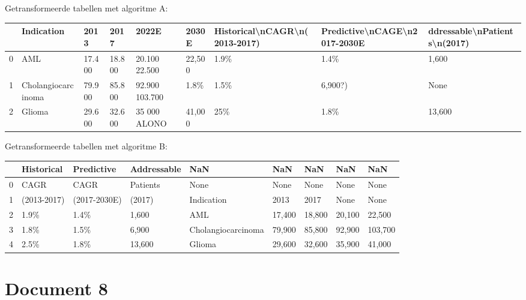 Getransformeerde tabellen met algoritme A:

\begin{tabular}{lllllllll}
\toprule
{} &          Indication &    2013 &    2017 &           2022E &   2030E & Historical\textbackslash nCAGR\textbackslash n(2013-2017) & Predictive\textbackslash nCAGE\textbackslash n2017-2030E & ddressable\textbackslash nPatients\textbackslash n(2017) \\
\midrule
0 &                 AML &  17.400 &  18.800 &   20.100 22.500 &  22,500 &                          1.9\% &                         1.4\% &                        1,600 \\
1 &  Cholangiocarcinoma &  79.900 &  85.800 &  92.900 103.700 &    1.8\% &                          1.5\% &                      6,900?) &                         None \\
2 &              Glioma &  29.600 &  32.600 &    35 000 ALONO &  41,000 &                           25\% &                         1.8\% &                       13,600 \\
\bottomrule
\end{tabular}

Getransformeerde tabellen met algoritme B:

\begin{tabular}{lllllllll}
\toprule
{} &   Historical &    Predictive & Addressable &                 NaN &     NaN &     NaN &     NaN &      NaN \\
\midrule
0 &         CAGR &          CAGR &    Patients &                None &    None &    None &    None &     None \\
1 &  (2013-2017) &  (2017-2030E) &      (2017) &          Indication &    2013 &    2017 &    None &     None \\
2 &         1.9\% &          1.4\% &       1,600 &                 AML &  17,400 &  18,800 &  20,100 &   22,500 \\
3 &         1.8\% &          1.5\% &       6,900 &  Cholangiocarcinoma &  79,900 &  85,800 &  92,900 &  103,700 \\
4 &         2.5\% &          1.8\% &      13,600 &              Glioma &  29,600 &  32,600 &  35,900 &   41,000 \\
\bottomrule
\end{tabular}
\section{Document 8}

